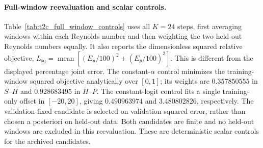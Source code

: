 \documentclass{article}
\providecommand{\DIFaddtex}[1]{{\protect\color{blue} \sf #1}} %
\providecommand{\DIFaddbegin}{} %
\providecommand{\DIFadd}[1]{\texorpdfstring{\DIFaddtex{#1}}{#1}} %
\begin{document}
\DIFaddbegin \paragraph{\DIFadd{Full-window reevaluation and scalar controls.}}
\DIFadd{Table~\ref{tab:t2c_full_window_controls} uses all $K=24$ steps, first
averaging windows within each Reynolds number and then weighting the
two held-out Reynolds numbers equally. It also reports the dimensionless
squared relative objective, $L_{\mathrm{sq}}=\operatorname{mean}
[(E_u/100)^2+(E_p/100)^2]$. This is different from the displayed
percentage joint error. The constant-$\alpha$ control minimizes the
training-window squared objective analytically over $[0,1]$; its weights
are $0.357850555$ in $S$--$H$ and $0.928683495$ in $H$--$P$.
The constant-logit control fits a single training-only offset in
$[-20,20]$, giving $0.490963974$ and $3.480802826$, respectively.
The validation-fixed candidate is selected on validation squared error,
rather than chosen a posteriori on held-out data. Both candidates are
finite and no held-out windows are excluded in this reevaluation.
These are deterministic scalar controls for the archived candidates.
}
\end{document}
